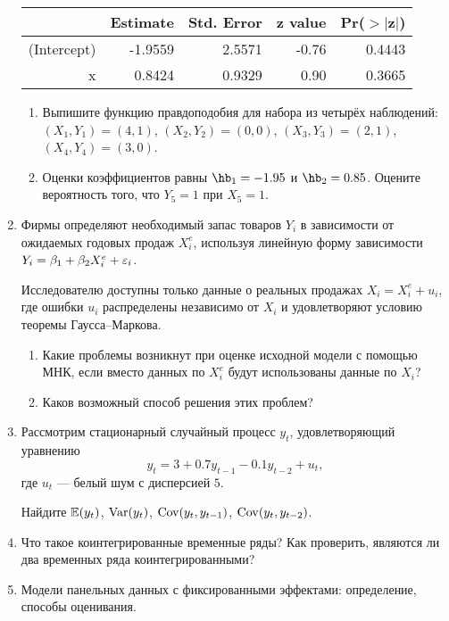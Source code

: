\documentclass[12pt, a4paper]{article}
\theoremstyle{definition}
\begin{document}
\begin{enumerate}
\begin{tabular}{rrrrr}
  \hline
 & Estimate & Std. Error & z value & Pr($>$$|$z$|$) \\
  \hline
(Intercept) & -1.9559 & 2.5571 & -0.76 & 0.4443 \\
  x & 0.8424 & 0.9329 & 0.90 & 0.3665 \\
   \hline
\end{tabular}


\begin{enumerate}
\item Выпишите функцию правдоподобия для набора из четырёх наблюдений: $(X_1, Y_1) = (4, 1)$, $(X_2, Y_2) = (0, 0)$,  $(X_3, Y_3) = (2, 1)$,  $(X_4, Y_4) = (3, 0)$.
\item Оценки коэффициентов равны $\hb_1 = -1.95$ и $\hb_2 = 0.85$. Оцените вероятность того, что $Y_5 = 1$ при $X_5 = 1$.
\end{enumerate}


\item Фирмы определяют необходимый запас товаров $Y_i$ в зависимости от ожидаемых годовых продаж $X^e_i$, используя линейную форму зависимости $Y_i = \beta_1  + \beta_2 X^e_i + \varepsilon_i$.


Исследователю доступны только данные о реальных продажах $X_i = X^e_i + u_i$, где ошибки $u_i$ распределены независимо от $X_i$ и удовлетворяют условию теоремы Гаусса–Маркова.

\begin{enumerate}
\item Какие проблемы возникнут при оценке исходной модели с помощью МНК, если вместо данных по $X^e_i$ будут использованы данные по $X_i$?
\item Каков возможный способ решения этих проблем?
\end{enumerate}





\item Рассмотрим стационарный случайный процесс $y_t$, удовлетворяющий уравнению
\[
y_t = 3 + 0.7 y_{t-1} - 0.1 y_{t-2} + u_t,
\]
где $u_t$ — белый шум с дисперсией $5$.

Найдите $\mathbb{E}(y_t)$, $\operatorname{Var}(y_t)$, $\operatorname{Cov}(y_t, y_{t-1})$, $\operatorname{Cov}(y_t, y_{t-2})$.

\item Что такое коинтегрированные временные ряды? Как проверить, являются ли два временных ряда коинтегрированными?

\item Модели панельных данных с фиксированными эффектами: определение, способы оценивания.

\end{enumerate}
\end{document}
